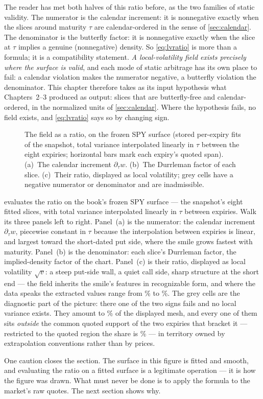 The reader has met both halves of this ratio before, as the two
families of static validity.  The numerator is the calendar increment:
it is nonnegative exactly when the slices around maturity $\tau$ are
calendar-ordered in the sense of \cref{sec:calendar}.  The denominator
is the butterfly factor: it is nonnegative exactly when the slice at
$\tau$ implies a genuine (nonnegative) density.  So \eqref{eq:lvratio}
is more than a formula; it is a compatibility statement.  \emph{A
local-volatility field exists precisely where the surface is valid},
and each mode of static arbitrage has its own place to fail: a
calendar violation makes the numerator negative, a butterfly violation
the denominator.  This chapter therefore takes as its input hypothesis
what Chapters~2--3 produced as output: slices that are butterfly-free
and calendar-ordered, in the normalized units of \cref{sec:calendar}.
Where the hypothesis fails, no field exists, and \eqref{eq:lvratio}
says so by changing sign.

\begin{figure}[htbp]
\centering
{}
\caption{The field as a ratio, on the frozen SPY surface (stored
per-expiry fits of the snapshot, total variance interpolated linearly
in $\tau$ between the eight expiries; horizontal bars mark each
expiry's quoted span).  (a)~The calendar increment $\partial_\tau w$.
(b)~The Durrleman factor of each slice.  (c)~Their ratio, displayed as
local volatility; grey cells have a negative numerator or denominator
and are inadmissible.}
\label{fig:lvratio}
\end{figure}

 evaluates the ratio on the book's frozen SPY
surface --- the snapshot's eight fitted slices, with total variance
interpolated linearly in $\tau$ between expiries.  Walk its three
panels left to right.  Panel~(a) is the numerator: the calendar
increment $\partial_\tau w$, piecewise constant in $\tau$ because the
interpolation between expiries is linear, and largest toward the
short-dated put side, where the smile grows fastest with maturity.
Panel~(b) is the denominator: each slice's Durrleman factor, the
implied-density factor of the chart.  Panel~(c) is their ratio,
displayed as local volatility $\sqrt v$: a steep put-side wall, a
quiet call side, sharp structure at the short end --- the field
inherits the smile's features in recognizable form, and where the data
speaks the extracted values range from \MacLvRatioLocMinPct\% to
\MacLvRatioLocMaxPct\%.  The grey cells are the diagnostic part of the
picture: there one of the two signs fails and no local variance
exists.  They amount to \MacLvRatioBadSharePct\% of the displayed
mesh, and every one of them sits \emph{outside} the common quoted
support of the two expiries that bracket it --- restricted to the
quoted region the share is \MacLvRatioBadQuotedSharePct\% --- in
territory owned by extrapolation conventions rather than by prices.

One caution closes the section.  The surface in this figure is fitted
and smooth, and evaluating the ratio on a fitted surface is a
legitimate operation --- it is how the figure was drawn.  What must
never be done is to apply the formula to the market's raw quotes.  The
next section shows why.
